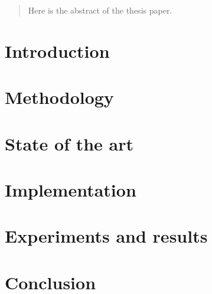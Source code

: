 \documentclass[12pt, a4paper]{report}
\author{oslo@itu.dk&ppho@itu.dk}
\begin{document}
\sffamily

%

\listoftodos



\begin{abstract}
Here is the abstract of the thesis paper.
\end{abstract}

\tableofcontents
\newpage



\chapter{Introduction}
\label{chap:introduction}


\restoregeometry
\newpage

\chapter{Methodology}
\label{chap:methodology}

\restoregeometry
\newpage

\chapter{State of the art}
\label{chap:stateOfTheArt}

\restoregeometry
\newpage

\chapter{Implementation}
\label{chap:implementation}


\restoregeometry
\newpage

\chapter{Experiments and results}
\label{chap:experiments}

\restoregeometry
\newpage

\chapter{Conclusion}
\label{chap:conclusion}

%

%
\printbibliography
\end{document}
